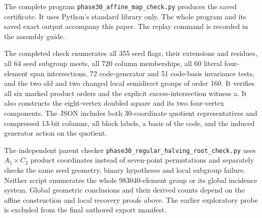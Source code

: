The complete program \texttt{phase30\_affine\_map\_check.py}
produces the saved certificate. It uses Python's standard
library only. The whole program and its saved exact output accompany
this paper. The replay command is recorded in the assembly guide.

The completed check enumerates all 355 seed flags, their extensions and
residues, all 64 seed subgroup meets, all 720 column memberships, all 60
literal four-element span intersections, 72 code-generator and 51
code-basis invariance tests, and the two old and two changed local
semidirect groups of order 160. It verifies all six marked product
orders and the explicit excess-intersection witness a. It also
constructs the eight-vertex doubled square and its two four-vertex
components. The JSON includes both 30-coordinate quotient
representatives and compressed 13-bit columns, all block labels, a basis
of the code, and the induced generator action on the quotient.

The independent parent checker
\texttt{phase30\_regular\_halving\_root\_check.py} uses
\(A_5\times C_2\) product coordinates instead of seven-point
permutations and separately checks the same seed geometry, binary
hypotheses and local subgroup failure. Neither script enumerates the
whole 983040-element group or its global incidence system. Global
geometric conclusions and their derived counts depend on the affine
construction and local recovery proofs above. The earlier exploratory
probe is excluded from the final authored export manifest.
